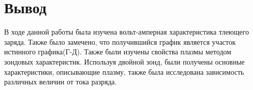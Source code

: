 \documentclass[a4paper,12pt]{article}
\begin{document}
\section*{Вывод}
В ходе данной работы была изучена вольт-амперная характеристика тлеющего заряда. Также было замечено, что получившийся график является участок истинного графика(Г-Д). Также были изучены свойства плазмы методом зондовых характеристик. Используя двойной зонд, были получены основные характеристики, описывающие плазму, также была исследована зависимость различных величин от тока разряда.
\end{document}

